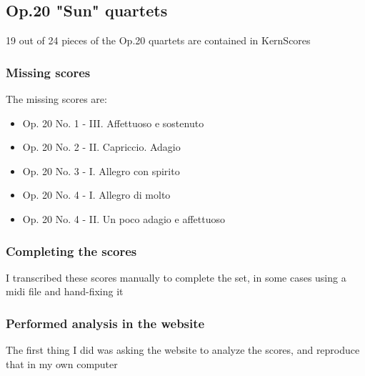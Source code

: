   \subsection{Op.20 "Sun" quartets}
    19 out of 24 pieces of the Op.20 quartets are contained in KernScores
    \subsubsection{Missing scores}
    The missing scores are:
    \begin{itemize}
      \item Op. 20 No. 1 - III. Affettuoso e sostenuto
      \item Op. 20 No. 2 - II. Capriccio. Adagio
      \item Op. 20 No. 3 - I. Allegro con spirito
      \item Op. 20 No. 4 - I. Allegro di molto
      \item Op. 20 No. 4 - II. Un poco adagio e affettuoso
    \end{itemize}
    \subsubsection{Completing the scores}
    I transcribed these scores manually to complete the set, in some cases using a midi file and hand-fixing it
    \subsubsection{Performed analysis in the website}
    The first thing I did was asking the website to analyze the scores, and reproduce that in my own computer


\newpage
